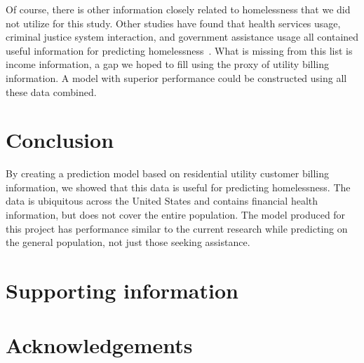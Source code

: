 \documentclass[10pt,letterpaper]{article}
\begin{document}
Of course, there is other information closely related to homelessness that we did not utilize for this study. Other studies have found that health services usage, criminal justice system interaction, and government assistance usage all contained useful information for predicting homelessness~\cite{byrne2020classification,flaming2011crisis,hong2018applications,shinn2013efficient,vanberlo2021interpretable}. What is missing from this list is income information, a gap we hoped to fill using the proxy of utility billing information. A model with superior performance could be constructed using all these data combined. 

\section*{Conclusion}
By creating a prediction model based on residential utility customer billing information, we showed that this data is useful for predicting homelessness. The data is ubiquitous across the United States and contains financial health information, but does not cover the entire population. The model produced for this project has performance similar to the current research while predicting on the general population, not just those seeking assistance.

\section*{Supporting information}


\section*{Acknowledgements}

\nolinenumbers

%
%
% 




\end{document}
